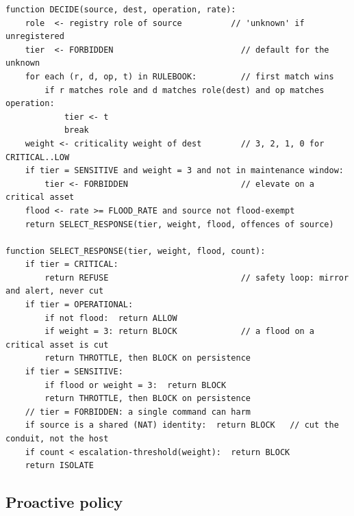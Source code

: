 \begin{lstlisting}[style=carspseudo,caption={The CARS operation decision. A tier is fixed by first match in the rulebook, a sensitive operation on a critical asset is elevated, and the tier, the criticality weight and the arrival rate select the graded response.},label={lst:decide}]
function DECIDE(source, dest, operation, rate):
    role  <- registry role of source          // 'unknown' if unregistered
    tier  <- FORBIDDEN                          // default for the unknown
    for each (r, d, op, t) in RULEBOOK:         // first match wins
        if r matches role and d matches role(dest) and op matches operation:
            tier <- t
            break
    weight <- criticality weight of dest        // 3, 2, 1, 0 for CRITICAL..LOW
    if tier = SENSITIVE and weight = 3 and not in maintenance window:
        tier <- FORBIDDEN                       // elevate on a critical asset
    flood <- rate >= FLOOD_RATE and source not flood-exempt
    return SELECT_RESPONSE(tier, weight, flood, offences of source)

function SELECT_RESPONSE(tier, weight, flood, count):
    if tier = CRITICAL:
        return REFUSE                           // safety loop: mirror and alert, never cut
    if tier = OPERATIONAL:
        if not flood:  return ALLOW
        if weight = 3: return BLOCK             // a flood on a critical asset is cut
        return THROTTLE, then BLOCK on persistence
    if tier = SENSITIVE:
        if flood or weight = 3:  return BLOCK
        return THROTTLE, then BLOCK on persistence
    // tier = FORBIDDEN: a single command can harm
    if source is a shared (NAT) identity:  return BLOCK   // cut the conduit, not the host
    if count < escalation-threshold(weight):  return BLOCK
    return ISOLATE
\end{lstlisting}

\subsection{Proactive policy}

